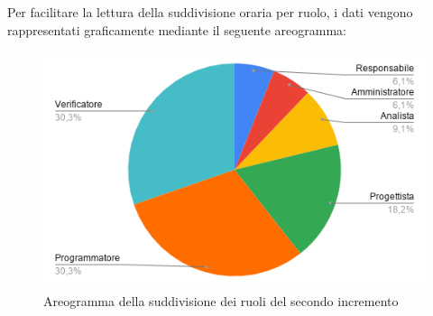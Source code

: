 \documentclass[../piano-di-progetto.tex]{subfiles}
\begin{document}
  Per facilitare la lettura della suddivisione oraria per ruolo, i dati vengono rappresentati graficamente mediante il seguente areogramma:
  \begin{figure}[H]
    \centering
    \includegraphics[width=12cm]{img/ruoli-2-incr.png}
    \caption{Areogramma della suddivisione dei ruoli del secondo incremento}
    \label{fig:ore-ruolo-progettazione}
  \end{figure}
\end{document}
